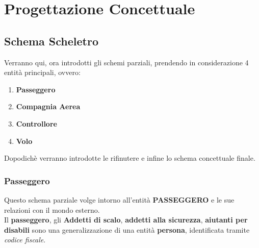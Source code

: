 
\newpage

\section{Progettazione Concettuale}

\subsection{Schema Scheletro}

\textsf{\small Verranno qui, ora introdotti gli schemi parziali, prendendo in considerazione 4 entità principali, ovvero: }
\begin{enumerate}
	\item \textbf{Passeggero}
	\item \textbf{Compagnia Aerea}
	\item \textbf{Controllore}
	\item \textbf{Volo}
\end{enumerate}

\textsf{\small Dopodichè verranno introdotte le rifinutere e infine lo schema concettuale finale.}\\ %


\enlargethispage{1\linewidth}

\subsubsection{Passeggero}

\textsf{\small Questo schema parziale volge intorno all'entità \textbf{PASSEGGERO} e le sue relazioni con il mondo esterno.}\\ %

\textsf{\small Il \textbf{passeggero}, gli \textbf{Addetti di scalo}, \textbf{addetti alla sicurezza}, \textbf{aiutanti per disabili} sono una generalizzazione di una entità \textbf{persona}, identificata tramite \emph{codice fiscale}.}\\ %

